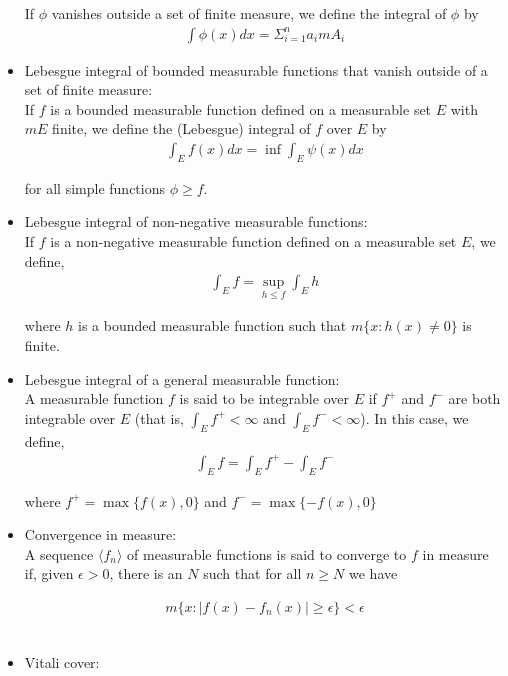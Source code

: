 \documentclass[12pt]{article}
\begin{document}
\begin{itemize}
If $\phi$ vanishes outside a set of finite measure, we define the integral of $\phi$ by
\begin{align*}
\int \phi(x) dx = \Sigma_{i=1}^n a_i mA_i
\end{align*}

\item Lebesgue integral of bounded measurable functions that vanish outside of a set of  finite measure:\\

If $f$ is a bounded measurable function defined on a measurable set $E$ with $mE$ finite, we define the (Lebesgue) integral of $f$ over $E$ by
\begin{align*}
\int_E f(x)dx = \inf \int_E \psi(x) dx
\end{align*}

for all simple functions $\phi \geq f$.
\\
\item Lebesgue integral of non-negative measurable functions:\\

If $f$ is a non-negative measurable function defined on a measurable set $E$, we define,
\begin{align*}
\int_E f = \sup_{h \leq f} \int_E h
\end{align*}

where $h$ is a bounded measurable function such that $m\{x: h(x) \neq 0\}$ is finite.
\\
\item Lebesgue integral of a general measurable function:\\

A measurable function $f$ is said to be integrable over $E$ if $f^+$ and $f^-$ are both integrable over $E$ (that is, $\int_E f^+ < \infty$ and $\int_E f^- < \infty$). In this case, we define,
\begin{align*}
\int_E f = \int_E f^+ - \int_E f^-
\end{align*}

where $f^+ = \max\{f(x), 0\}$ and $f^- = \max\{-f(x), 0\}$
\\
\item Convergence in measure:\\

A sequence $\langle f_n \rangle$ of measurable functions is said to converge to $f$ in measure if, given $\epsilon > 0$, there is an $N$ such that for all $n \geq N$ we have

\begin{align*}
m\{x: |f(x) - f_n(x)| \geq \epsilon\} < \epsilon
\end{align*}
\\
\item Vitali cover:\\


\end{itemize}
\end{document}
